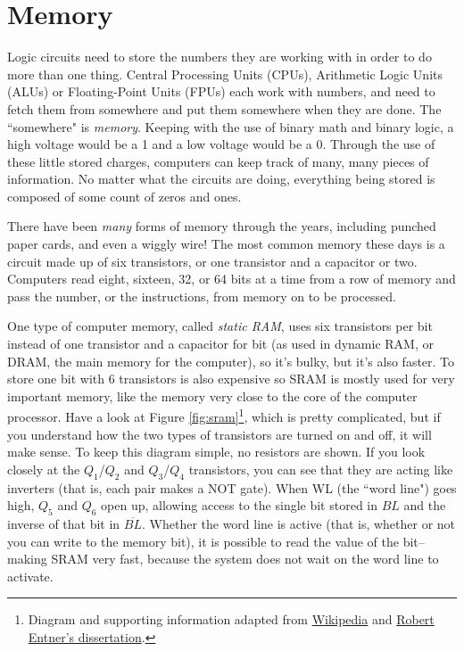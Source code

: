 \newpage
\section*{Memory}

Logic circuits need to store the numbers they are working with in order to do more than one thing. Central Processing Units (CPUs), Arithmetic Logic Units (ALUs) or Floating-Point Units (FPUs) each work with numbers, and need to fetch them from somewhere and put them somewhere when they are done. The ``somewhere" is \emph{memory}. Keeping with the use of binary math and binary logic, a high voltage would be a 1 and a low voltage would be a 0. Through the use of these little stored charges, computers can keep track of many, many pieces of information. No matter what the circuits are doing, everything being stored is composed of some count of zeros and ones. 

There have been \emph{many} forms of memory through the years, including punched paper cards, and even a wiggly wire! The most common memory these days is a circuit made up of six transistors, or one transistor and a capacitor or two. Computers read eight, sixteen, 32, or 64 bits at a time from a row of memory and pass the number, or the instructions, from memory on to be processed.

One type of computer memory, called \emph{static RAM}, uses six transistors per bit instead of one transistor and a capacitor for bit (as used in dynamic RAM, or DRAM, the main memory for the computer), so it's bulky, but it's also faster. To store one bit with 6 transistors is also expensive so SRAM is mostly used for very important memory, like the memory very close to the core of the computer processor. Have a look at Figure \ref{fig:sram}\footnote{Diagram and supporting information adapted from {\color{webblue}\href{https://en.wikipedia.org/wiki/Static_random-access_memory}{Wikipedia}} and {\color{webblue}\href{https://www.entner.net/sites/default/files/diss-entner-final-v1.pdf}{Robert Entner's dissertation}}.}, 
which is pretty complicated, but if you understand how the two types of transistors are turned on and off, it will make sense. To keep this diagram simple, no resistors are shown. If you look closely at the $Q_1$/$Q_2$ and $Q_3$/$Q_4$ transistors, you can see that they are acting like inverters (that is, each pair makes a NOT gate). When WL (the ``word line") goes high, $Q_5$ and $Q_6$ open up, allowing access to the single bit stored in $BL$ and the inverse of that bit in $\overline{BL}$. Whether the word line is active (that is, whether or not you can write to the memory bit), it is possible to read the value of the bit--making SRAM very fast, because the system does not wait on the word line to activate.

